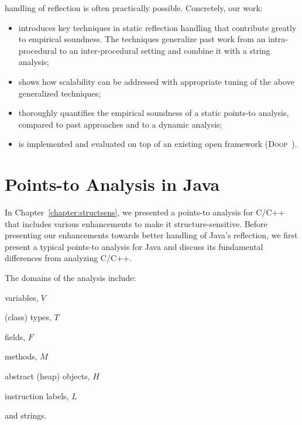 handling of reflection is often practically possible. Concretely, our
work:
\begin{itemize}[\(\cdot\)]
\item introduces key techniques in static reflection handling that
  contribute greatly to empirical soundness. The techniques generalize
  past work from an intra-procedural to an inter-procedural setting
  and combine it with a string analysis;
\item shows how scalability can be addressed with appropriate tuning
  of the above generalized techniques;
\item thoroughly quantifies the empirical soundness of a static
  points-to analysis, compared to past approaches and to a dynamic
  analysis;
\item is implemented and evaluated on top of an existing open
  framework (\textsc{Doop}~\cite{oopsla/BravenboerS09}).
\end{itemize}



\section{Points-to Analysis in Java}
\label{reflection/sec:javapt}

In Chapter~\ref{chapter:structsens}, we presented a points-to analysis
for C/C++ that includes various enhancements to make it
structure-sensitive. Before presenting our enhancements towards better
handling of Java's reflection, we first present a typical points-to
analysis for Java and discuss its fundamental differences from
analyzing C/C++.

The domains of the analysis include:
\begin{compactitem}[\(\cdot\)]
\item variables, \(V\)
\item (class) types, \(T\)
\item fields, \(F\)
\item methods, \(M\)
\item abstract (heap) objects, \(H\)
\item instruction labels, \(L\)
\item and strings.
\end{compactitem}

